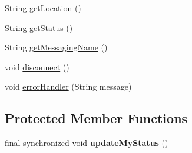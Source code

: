 \begin{DoxyCompactItemize}
\item 
String \hyperlink{classgov_1_1fnal_1_1ppd_1_1dd_1_1display_1_1client_1_1UpdateDatabaseForDisplayChannels_a753f8c4ad34a649221a78ad963f44d28}{get\-Location} ()
\item 
String \hyperlink{classgov_1_1fnal_1_1ppd_1_1dd_1_1display_1_1client_1_1UpdateDatabaseForDisplayChannels_a839b068caf40194233bb6040c6a7a29d}{get\-Status} ()
\item 
String \hyperlink{classgov_1_1fnal_1_1ppd_1_1dd_1_1display_1_1client_1_1UpdateDatabaseForDisplayChannels_a6bd0e5cfb4362cd534592faf1df8e381}{get\-Messaging\-Name} ()
\item 
void \hyperlink{classgov_1_1fnal_1_1ppd_1_1dd_1_1display_1_1client_1_1UpdateDatabaseForDisplayChannels_a16818671921624744a8323ef36766517}{disconnect} ()
\item 
void \hyperlink{classgov_1_1fnal_1_1ppd_1_1dd_1_1display_1_1client_1_1UpdateDatabaseForDisplayChannels_aa76c9578b86e1ffed9c4287d3633f821}{error\-Handler} (String message)
\end{DoxyCompactItemize}
\subsection*{Protected Member Functions}
\begin{DoxyCompactItemize}
\item 
\hypertarget{classgov_1_1fnal_1_1ppd_1_1dd_1_1display_1_1client_1_1UpdateDatabaseForDisplayChannels_a1743e409cda7e6d714197c2ec35cdece}{final synchronized void {\bfseries update\-My\-Status} ()}\label{classgov_1_1fnal_1_1ppd_1_1dd_1_1display_1_1client_1_1UpdateDatabaseForDisplayChannels_a1743e409cda7e6d714197c2ec35cdece}

\end{DoxyCompactItemize}



